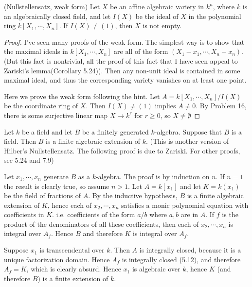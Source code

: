 \documentclass{solution}
\begin{document}
\begin{problem}
    (Nullstellensatz, weak form) Let $X$ be an affine algebraic variety in $k^n$, where $k$ is an algebraically closed field, and let $I(X)$ be the ideal of $X$ in the polynomial ring $k[X_1, \cdots, X_n]$. If $I(X) \ne (1)$, then $X$ is not empty.
\end{problem}

\begin{proof}
    {\color{red}I've seen many proofs of the weak form. The simplest way is to show that the maximal ideals in $k[X_1, \cdots, X_n]$ are all of the form $(X_1 - x_1, \cdots, X_n - x_n)$. (But this fact is nontrivial, all the proof of this fact that I have seen appeal to Zariski's lemma(Corollary 5.24)). Then any non-unit ideal is contained in some maximal ideal, and thus the corresponding variety vanishes on at least one point.}

    Here we prove the weak form following the hint. Let $A = k[X_1, \cdots, X_n] / I(X)$ be the coordinate ring of $X$. Then $I(X) \ne (1)$ implies $A \ne 0$. By Problem 16, there is some surjective linear map $X \rightarrow k^r$ for $r \ge 0$, so $X \ne \emptyset$
\end{proof}

\begin{problem}
    Let $k$ be a field and let $B$ be a finitely generated $k$-algebra. Suppose that $B$ is a field. Then $B$ is a finite algebraic extension of $k$. (This is another version of Hilber's Nullstellensatz. The following proof is due to Zariski. For other proofs, see 5.24 and 7.9)

    Let $x_1, \cdots, x_n$ generate $B$ as a $k$-algebra. The proof is by induction on $n$. If $n = 1$ the result is clearly true, so assume $n \gt 1$. Let $A = k[x_1]$ and let $K = k(x_1)$ be the field of fractions of $A$. By the inductive hypothesis, $B$ is a finite algebraic extension of $K$, hence each of $x_2, \cdots, x_n$ satisfies a monic polynomial equation with coefficients in $K$. i.e. coefficients of the form $a / b$ where $a, b$ are in $A$. If $f$ is the product of the denominators of all these coefficients, then each of $x_2, \cdots, x_n$ is integral over $A_f$. Hence $B$ and therefore $K$ is integral over $A_f$.

    Suppose  $x_1$ is transcendental over $k$. Then $A$ is integrally closed, because it is a unique factorization domain. Hence $A_f$ is integrally closed (5.12), and therefore $A_f = K$, which is clearly absurd. Hence $x_1$ is algebraic over $k$, hence $K$ (and therefore $B$) is a finite extension of $k$.
\end{problem}
\end{document}
